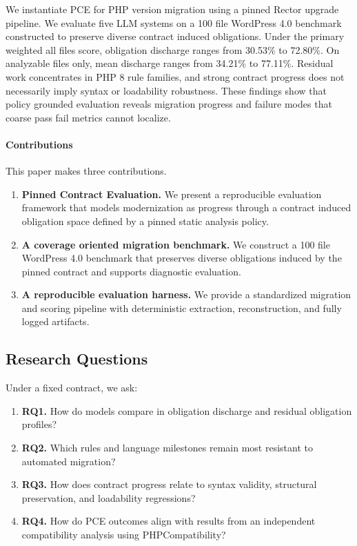 We instantiate PCE for PHP version migration using a pinned Rector upgrade pipeline.\cite{rector}
We evaluate five LLM systems on a 100 file WordPress 4.0 benchmark constructed to preserve diverse contract induced obligations.
Under the primary weighted all files score, obligation discharge ranges from 30.53\% to 72.80\%.
On analyzable files only, mean discharge ranges from 34.21\% to 77.11\%.
Residual work concentrates in PHP 8 rule families, and strong contract progress does not necessarily imply syntax or loadability robustness.
These findings show that policy grounded evaluation reveals migration progress and failure modes that coarse pass fail metrics cannot localize.

\paragraph*{Contributions}
This paper makes three contributions.

\begin{enumerate}

\item \textbf{Pinned Contract Evaluation.}
We present a reproducible evaluation framework that models modernization as progress through a contract induced obligation space defined by a pinned static analysis policy.

\item \textbf{A coverage oriented migration benchmark.}
We construct a 100 file WordPress 4.0 benchmark that preserves diverse obligations induced by the pinned contract and supports diagnostic evaluation.

\item \textbf{A reproducible evaluation harness.}
We provide a standardized migration and scoring pipeline with deterministic extraction, reconstruction, and fully logged artifacts.

\end{enumerate}

\subsection{Research Questions}
\label{sec:rqs}

Under a fixed contract, we ask:

\begin{enumerate}

\item \textbf{RQ1.} How do models compare in obligation discharge and residual obligation profiles?

\item \textbf{RQ2.} Which rules and language milestones remain most resistant to automated migration?

\item \textbf{RQ3.} How does contract progress relate to syntax validity, structural preservation, and loadability regressions?

\item \textbf{RQ4.} How do PCE outcomes align with results from an independent compatibility analysis using PHPCompatibility?

\end{enumerate}